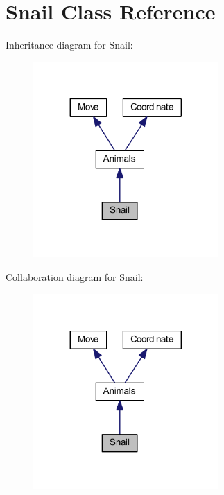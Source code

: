 \hypertarget{class_snail}{}\section{Snail Class Reference}
\label{class_snail}


Inheritance diagram for Snail\+:
\nopagebreak
\begin{figure}[H]
\begin{center}
\leavevmode
\includegraphics[width=200pt]{class_snail__inherit__graph}
\end{center}
\end{figure}


Collaboration diagram for Snail\+:
\nopagebreak
\begin{figure}[H]
\begin{center}
\leavevmode
\includegraphics[width=200pt]{class_snail__coll__graph}
\end{center}
\end{figure}
